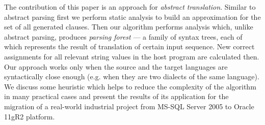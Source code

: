 The contribution of this paper is an approach for \emph{abstract translation}. 
Similar to abstract parsing first we perform static analysis to build an approximation for the set of all 
generated clauses. Then our algorithm performs analysis which, unlike abstract parsing, produces 
\emph{parsing forest} --- a family of syntax trees, each of which represents the result of
translation of certain input sequence. New correct assignments for all relevant string values in the host program 
are calculated then. Our approach works only when the source and the target languages are syntactically close 
enough (e.g. when they are two dialects of the same language).  We discuss some heuristic which helps to reduce 
the complexity of the algorithm in many practical cases and present the results of its application for the 
migration of a real-world industrial project from MS-SQL Server 2005 to Oracle 11gR2 platform.







